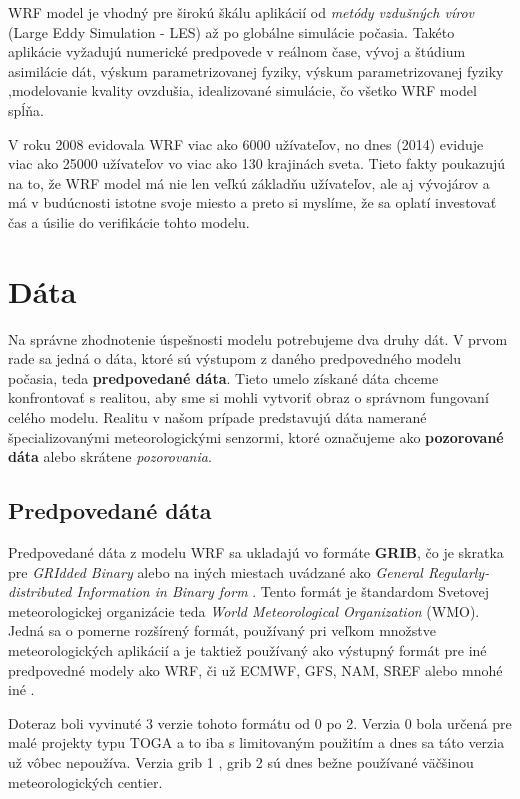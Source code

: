 WRF model je vhodný pre širokú škálu aplikácií od \textit{metódy vzdušných vírov} (Large Eddy Simulation - LES) až po globálne simulácie počasia. Takéto aplikácie vyžadujú numerické predpovede v reálnom čase, vývoj a štúdium asimilácie dát, výskum parametrizovanej fyziky, výskum parametrizovanej fyziky ,modelovanie kvality ovzdušia, idealizované simulácie, čo všetko WRF model spĺňa.

V roku 2008 evidovala WRF viac ako 6000 užívateľov, no dnes (2014) eviduje viac ako 25000 užívateľov vo viac ako 130 krajinách sveta. Tieto fakty poukazujú na to, že WRF model má nie len veľkú základňu užívateľov, ale aj vývojárov a má v budúcnosti istotne svoje miesto a preto si myslíme, že sa oplatí investovať čas a úsilie do verifikácie tohto modelu.

\section{Dáta}
Na správne zhodnotenie úspešnosti modelu potrebujeme dva druhy dát. V prvom rade sa jedná o dáta, ktoré sú výstupom z daného predpovedného modelu počasia, teda \textbf{predpovedané dáta}. Tieto umelo získané dáta chceme konfrontovať s realitou, aby sme si mohli vytvoriť obraz o správnom fungovaní celého modelu. Realitu v našom prípade predstavujú dáta namerané špecializovanými meteorologickými senzormi, ktoré označujeme ako \textbf{pozorované dáta} alebo skrátene \textit{pozorovania}.  

\subsection{Predpovedané dáta}
Predpovedané dáta z modelu WRF sa ukladajú vo formáte \textbf{GRIB}, čo je skratka pre \textit{GRIdded Binary} \cite{GRIB} alebo na iných miestach uvádzané ako \textit{General Regularly-distributed Information in Binary form} \cite{GRIB12}. Tento formát je štandardom Svetovej meteorologickej organizácie teda \textit{World Meteorological Organization} (WMO). Jedná sa o pomerne rozšírený formát, používaný pri veľkom množstve meteorologických aplikácií a je taktiež používaný ako výstupný formát pre iné predpovedné modely ako WRF, či už ECMWF, GFS, NAM, SREF alebo mnohé iné \cite{Products}.

Doteraz boli vyvinuté 3 verzie tohoto formátu od 0 po 2. Verzia 0 bola určená pre malé projekty typu TOGA a to iba s limitovaným použitím a dnes sa táto verzia už vôbec nepoužíva. Verzia grib 1 \cite{GRIB}, grib 2 \cite{GRIB12} sú dnes bežne používané väčšinou meteorologických centier.


